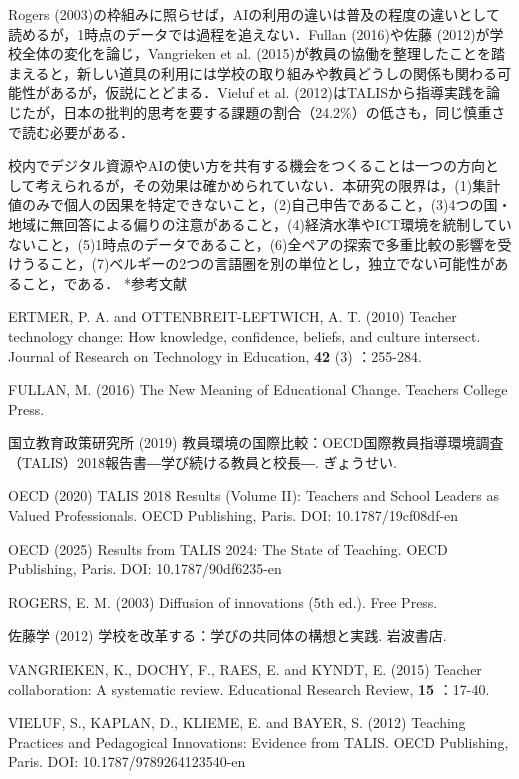 \documentclass[a4paper,10pt,twocolumn]{ltjsarticle}
\makeatletter
\renewcommand{\section}{\@startsection{section}{1}{\z@}{1.1\Cvs \@plus.4\Cdp \@minus.2\Cdp}{.5\Cvs \@plus.2\Cdp}{\normalfont\gtfamily\bfseries\large}}
\makeatother
\begin{document}
Rogers (2003)の枠組みに照らせば，AIの利用の違いは普及の程度の違いとして読めるが，1時点のデータでは過程を追えない．Fullan (2016)や佐藤 (2012)が学校全体の変化を論じ，Vangrieken et al. (2015)が教員の協働を整理したことを踏まえると，新しい道具の利用には学校の取り組みや教員どうしの関係も関わる可能性があるが，仮説にとどまる．Vieluf et al. (2012)はTALISから指導実践を論じたが，日本の批判的思考を要する課題の割合（24.2\%）の低さも，同じ慎重さで読む必要がある．

校内でデジタル資源やAIの使い方を共有する機会をつくることは一つの方向として考えられるが，その効果は確かめられていない．本研究の限界は，(1)集計値のみで個人の因果を特定できないこと，(2)自己申告であること，(3)4つの国・地域に無回答による偏りの注意があること，(4)経済水準やICT環境を統制していないこと，(5)1時点のデータであること，(6)全ペアの探索で多重比較の影響を受けうること，(7)ベルギーの2つの言語圏を別の単位とし，独立でない可能性があること，である．
\section*{参考文献}
\begingroup\scriptsize\raggedright{} 
\begin{list}{}{\setlength{\leftmargin}{1.5\zw}\setlength{\itemindent}{-1.5\zw}\setlength{\labelwidth}{0pt}\setlength{\labelsep}{0pt}\setlength{\itemsep}{1pt}\setlength{\parsep}{0pt}\setlength{\topsep}{0pt}\setlength{\listparindent}{0pt}}
\item ERTMER, P. A. and OTTENBREIT-LEFTWICH, A. T. (2010) Teacher technology change: How knowledge, confidence, beliefs, and culture intersect. Journal of Research on Technology in Education, \textbf{42} (3) ：255-284.
\item FULLAN, M. (2016) The New Meaning of Educational Change. Teachers College Press.
\item 国立教育政策研究所 (2019) 教員環境の国際比較：OECD国際教員指導環境調査（TALIS）2018報告書―学び続ける教員と校長―. ぎょうせい.
\item OECD (2020) TALIS 2018 Results (Volume II): Teachers and School Leaders as Valued Professionals. OECD Publishing, Paris. DOI: 10.1787/19cf08df-en
\item OECD (2025) Results from TALIS 2024: The State of Teaching. OECD Publishing, Paris. DOI: 10.1787/90df6235-en
\item ROGERS, E. M. (2003) Diffusion of innovations (5th ed.). Free Press.
\item 佐藤学 (2012) 学校を改革する：学びの共同体の構想と実践. 岩波書店.
\item VANGRIEKEN, K., DOCHY, F., RAES, E. and KYNDT, E. (2015) Teacher collaboration: A systematic review. Educational Research Review, \textbf{15} ：17-40.
\item VIELUF, S., KAPLAN, D., KLIEME, E. and BAYER, S. (2012) Teaching Practices and Pedagogical Innovations: Evidence from TALIS. OECD Publishing, Paris. DOI: 10.1787/9789264123540-en
\end{list}\endgroup
\end{document}
